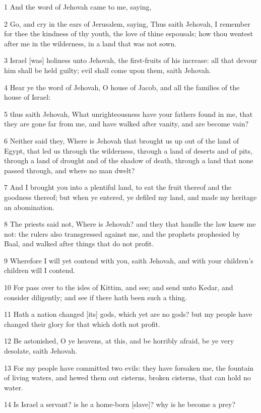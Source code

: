 \par 1 And the word of Jehovah came to me, saying,
\par 2 Go, and cry in the ears of Jerusalem, saying, Thus saith Jehovah, I remember for thee the kindness of thy youth, the love of thine espousals; how thou wentest after me in the wilderness, in a land that was not sown.
\par 3 Israel [was] holiness unto Jehovah, the first-fruits of his increase: all that devour him shall be held guilty; evil shall come upon them, saith Jehovah.
\par 4 Hear ye the word of Jehovah, O house of Jacob, and all the families of the house of Israel:
\par 5 thus saith Jehovah, What unrighteousness have your fathers found in me, that they are gone far from me, and have walked after vanity, and are become vain?
\par 6 Neither said they, Where is Jehovah that brought us up out of the land of Egypt, that led us through the wilderness, through a land of deserts and of pits, through a land of drought and of the shadow of death, through a land that none passed through, and where no man dwelt?
\par 7 And I brought you into a plentiful land, to eat the fruit thereof and the goodness thereof; but when ye entered, ye defiled my land, and made my heritage an abomination.
\par 8 The priests said not, Where is Jehovah? and they that handle the law knew me not: the rulers also transgressed against me, and the prophets prophesied by Baal, and walked after things that do not profit.
\par 9 Wherefore I will yet contend with you, saith Jehovah, and with your children's children will I contend.
\par 10 For pass over to the isles of Kittim, and see; and send unto Kedar, and consider diligently; and see if there hath been such a thing.
\par 11 Hath a nation changed [its] gods, which yet are no gods? but my people have changed their glory for that which doth not profit.
\par 12 Be astonished, O ye heavens, at this, and be horribly afraid, be ye very desolate, saith Jehovah.
\par 13 For my people have committed two evils: they have forsaken me, the fountain of living waters, and hewed them out cisterns, broken cisterns, that can hold no water.
\par 14 Is Israel a servant? is he a home-born [slave]? why is he become a prey?
